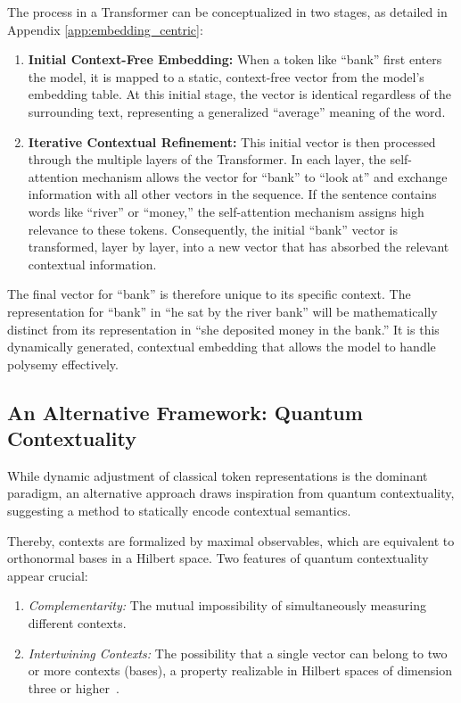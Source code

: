 \documentclass[%
  reprint,
  superscriptaddress,
  showpacs,
  showkeys,
  amsmath,amssymb,
  pra,
  longbibliography,
  floatfix,
  x11names
]{revtex4-2}
\begin{document}
The process in a Transformer can be conceptualized in two stages, as detailed in Appendix \ref{app:embedding_centric}:
\begin{enumerate}
    \item \textbf{Initial Context-Free Embedding:} When a token like ``bank'' first enters the model, it is mapped to a static, context-free vector from the model's embedding table. At this initial stage, the vector is identical regardless of the surrounding text, representing a generalized ``average'' meaning of the word.
    \item \textbf{Iterative Contextual Refinement:} This initial vector is then processed through the multiple layers of the Transformer. In each layer, the self-attention mechanism allows the vector for ``bank'' to ``look at'' and exchange information with all other vectors in the sequence. If the sentence contains words like ``river'' or ``money,'' the self-attention mechanism assigns high relevance to these tokens. Consequently, the initial ``bank'' vector is transformed, layer by layer, into a new vector that has absorbed the relevant contextual information.
\end{enumerate}
The final vector for ``bank'' is therefore unique to its specific context. The representation for ``bank'' in ``he sat by the river bank'' will be mathematically distinct from its representation in ``she deposited money in the bank.'' It is this dynamically generated, contextual embedding that allows the model to handle polysemy effectively.

\subsection{An Alternative Framework: Quantum Contextuality}

While dynamic adjustment of classical token representations is the dominant paradigm,
an alternative approach draws inspiration from quantum contextuality,
suggesting a method to statically encode contextual semantics.

Thereby, contexts are formalized by maximal observables,
which are equivalent to orthonormal bases in a Hilbert space.
Two features of quantum contextuality appear crucial:
\begin{enumerate}
    \item \textit{Complementarity:} The mutual impossibility of simultaneously measuring different contexts.
    \item \textit{Intertwining Contexts:}
The possibility that a single vector can belong to two or more contexts (bases),
a property realizable in Hilbert spaces of dimension three or higher~\cite{Gleason}.
\end{enumerate}
\end{document}

